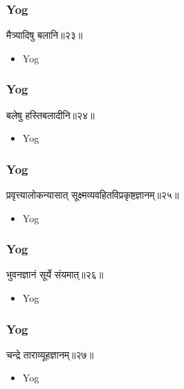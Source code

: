 \begin{frame}[fragile]\frametitle{Yog}
\begin{sanskrit}
मैत्र्यादिषु बलानि॥२३॥
\end{sanskrit}
	\begin{itemize}
	\item Yog 
	\end{itemize}
\end{frame}


\begin{frame}[fragile]\frametitle{Yog}
\begin{sanskrit}
बलेषु हस्तिबलादीनि॥२४॥
\end{sanskrit}
	\begin{itemize}
	\item Yog 
	\end{itemize}
\end{frame}

\begin{frame}[fragile]\frametitle{Yog}
\begin{sanskrit}
प्रवृत्त्यालोकन्यासात् सूक्ष्मव्यवहितविप्रकृष्टज्ञानम्॥२५॥
\end{sanskrit}
	\begin{itemize}
	\item Yog 
	\end{itemize}
\end{frame}

\begin{frame}[fragile]\frametitle{Yog}
\begin{sanskrit}
भुवनज्ञानं सूर्ये संयमात्॥२६॥
\end{sanskrit}
	\begin{itemize}
	\item Yog 
	\end{itemize}
\end{frame}

\begin{frame}[fragile]\frametitle{Yog}
\begin{sanskrit}
चन्द्रे ताराव्यूहज्ञानम्॥२७॥
\end{sanskrit}
	\begin{itemize}
	\item Yog 
	\end{itemize}
\end{frame}

